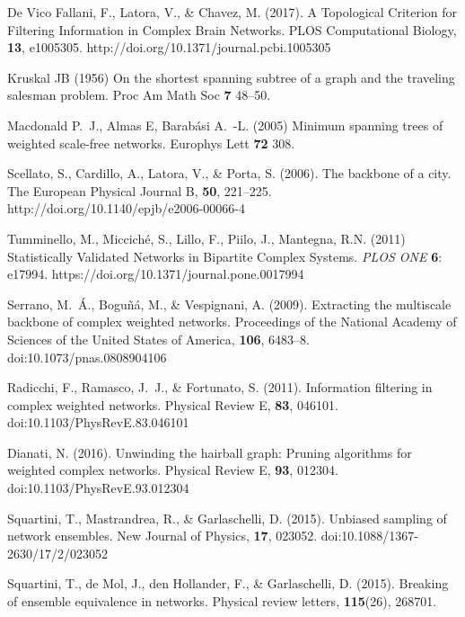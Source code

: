 \documentclass[aps,twocolumn,superscriptaddress]{revtex4-1}
\begin{document}
\begin{thebibliography}{99}
 De Vico Fallani, F., Latora,
V., \& Chavez, M. (2017). A Topological Criterion for Filtering
Information in Complex Brain Networks. PLOS Computational Biology, {\bf 13}, e1005305. http://doi.org/10.1371/journal.pcbi.1005305



 Kruskal JB (1956) On the shortest spanning subtree of a graph and the traveling salesman problem. Proc Am Math Soc {\bf 7} 48--50.

 Macdonald P.~J., Almas E, Barab\'asi A.~-L. (2005) Minimum spanning trees of weighted scale-free networks. Europhys Lett {\bf 72} 308.

 Scellato, S., Cardillo, A., Latora, V., \& Porta, S. (2006). The backbone of a city. The European Physical Journal B, {\bf 50}, 221--225. http://doi.org/10.1140/epjb/e2006-00066-4


 Tumminello, M., Miccich\'e, S., Lillo, F., Piilo, J., Mantegna, R.N. (2011) Statistically Validated Networks in Bipartite Complex Systems. {\em PLOS ONE} {\bf 6}: e17994. https://doi.org/10.1371/journal.pone.0017994



 Serrano, M.~\'A., Bogu\~n\'a, M., \& Vespignani, A. (2009). Extracting the multiscale backbone of complex weighted networks. Proceedings of the National Academy of Sciences of the United States of America, {\bf 106}, 6483--8. doi:10.1073/pnas.0808904106

 Radicchi, F., Ramasco, J.~J., \& Fortunato, S. (2011). Information filtering in complex weighted networks. Physical Review E, {\bf 83}, 046101. doi:10.1103/PhysRevE.83.046101

 Dianati, N. (2016). Unwinding the hairball graph: Pruning algorithms for weighted complex networks. Physical Review E, {\bf 93}, 012304. doi:10.1103/PhysRevE.93.012304


Squartini, T., Mastrandrea, R., \& Garlaschelli, D. (2015). Unbiased sampling of network ensembles. New Journal of Physics, {\bf 17}, 023052. doi:10.1088/1367-2630/17/2/023052

Squartini, T., de Mol, J., den Hollander, F., \& Garlaschelli, D. (2015). Breaking of ensemble equivalence in networks. Physical review letters, {\bf 115}(26), 268701.


\end{thebibliography}
\end{document}
